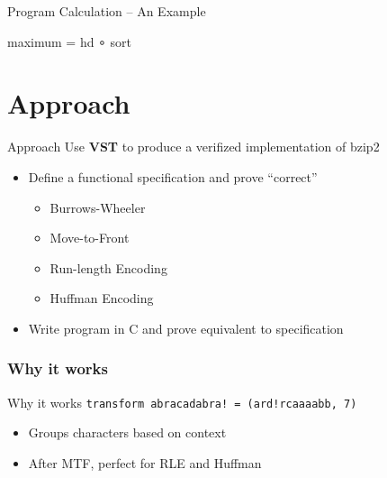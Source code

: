 \documentclass{beamer}
\begin{document}
  \begin{frame}[fragile]{Program Calculation -- An Example}
    \begin{semiverbatim}
maximum = hd ∘ sort

 

 
    \end{semiverbatim}
  \end{frame}

  \section{Approach}
  \begin{frame}{Approach}
    Use \textbf{VST} to produce a verifized implementation of bzip2
    \begin{itemize}
    \item Define a functional specification and prove ``correct''
      \begin{itemize}
      \item \alert{Burrows-Wheeler}
      \item Move-to-Front
      \item Run-length Encoding
      \item Huffman Encoding
      \end{itemize}
    \item Write program in C and prove equivalent to specification
    \end{itemize}

  \end{frame}

  \subsubsection{Why it works}
  \begin{frame}{Why it works}
    \texttt{transform abracadabra! = (ard!rcaaaabb, 7)}
    \begin{itemize}
      \item<+-> Groups characters based on context
      \item<+-> After MTF, perfect for RLE and Huffman
    \end{itemize}
  \end{frame}
\end{document}
